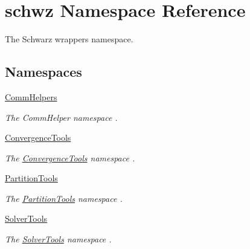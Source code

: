 \hypertarget{namespaceschwz}{}\section{schwz Namespace Reference}
\label{namespaceschwz}


The Schwarz wrappers namespace.  


\subsection*{Namespaces}
\begin{DoxyCompactItemize}
\item 
 \hyperlink{namespaceschwz_1_1CommHelpers}{Comm\+Helpers}
\begin{DoxyCompactList}\small\item\em The Comm\+Helper namespace . \end{DoxyCompactList}\item 
 \hyperlink{namespaceschwz_1_1ConvergenceTools}{Convergence\+Tools}
\begin{DoxyCompactList}\small\item\em The \hyperlink{namespaceschwz_1_1ConvergenceTools}{Convergence\+Tools} namespace . \end{DoxyCompactList}\item 
 \hyperlink{namespaceschwz_1_1PartitionTools}{Partition\+Tools}
\begin{DoxyCompactList}\small\item\em The \hyperlink{namespaceschwz_1_1PartitionTools}{Partition\+Tools} namespace . \end{DoxyCompactList}\item 
 \hyperlink{namespaceschwz_1_1SolverTools}{Solver\+Tools}
\begin{DoxyCompactList}\small\item\em The \hyperlink{namespaceschwz_1_1SolverTools}{Solver\+Tools} namespace . \end{DoxyCompactList}\end{DoxyCompactItemize}
